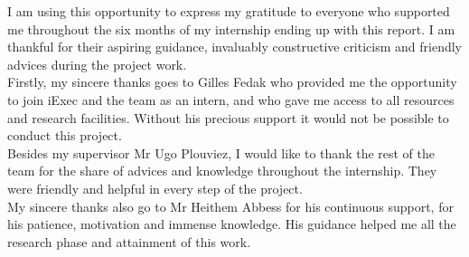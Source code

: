 
\begin{acknowledgements}      

    I am using this opportunity to express my gratitude to everyone who supported me throughout the six months 
    of my internship ending up with this report. I am thankful for their aspiring guidance, invaluably
    constructive criticism and friendly advices during the project work.\\
    Firstly, my sincere thanks  goes to Gilles Fedak who provided me the opportunity to join iExec
    and the team as an intern, and who gave me access to all resources and research facilities. Without his
    precious support it would not be possible to conduct this project.\\
    Besides my supervisor Mr Ugo Plouviez, I would like to thank the rest of the team for the share of advices
    and knowledge throughout the internship. They were friendly and helpful in every step of the project.\\
    My sincere thanks also go to Mr Heithem Abbess for his continuous support, for his patience, motivation 
    and immense knowledge. His guidance helped me all the research phase and attainment of this work.


\end{acknowledgements}
